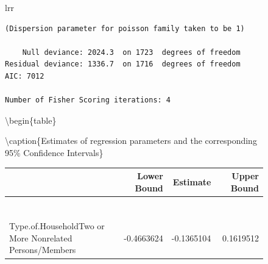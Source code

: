 \documentclass[
]{article}
\begin{document}
\begin{figure}[H]
\begin{table}[H]
\begin{tabular}[t]{lrr}
\begin{verbatim}
(Dispersion parameter for poisson family taken to be 1)

    Null deviance: 2024.3  on 1723  degrees of freedom
Residual deviance: 1336.7  on 1716  degrees of freedom
AIC: 7012

Number of Fisher Scoring iterations: 4
\end{verbatim}

\textbackslash begin\{table\}

\textbackslash caption\{\label{tab:table of estimates and confidence intervals sig}Estimates
of regression parameters and the corresponding 95\% Confidence
Intervals\} \centering

\begin{tabular}[t]{l|r|r|r}
\hline
  & Lower Bound & Estimate & Upper Bound\\
\hline
\cellcolor[HTML]{A1E8F1}{\textcolor{black}{(Intercept)}} & \cellcolor[HTML]{A1E8F1}{\textcolor{black}{1.2992842}} & \cellcolor[HTML]{A1E8F1}{\textcolor{black}{1.4313832}} & \cellcolor[HTML]{A1E8F1}{\textcolor{black}{1.5630233}}\\
\hline
\cellcolor[HTML]{A1E8F1}{\textcolor{black}{Total.Household.Income}} & \cellcolor[HTML]{A1E8F1}{\textcolor{black}{-0.0040352}} & \cellcolor[HTML]{A1E8F1}{\textcolor{black}{-0.0028211}} & \cellcolor[HTML]{A1E8F1}{\textcolor{black}{-0.0016258}}\\
\hline
\cellcolor[HTML]{A1E8F1}{\textcolor{black}{Total.Food.Expenditure}} & \cellcolor[HTML]{A1E8F1}{\textcolor{black}{0.0434480}} & \cellcolor[HTML]{A1E8F1}{\textcolor{black}{0.0503772}} & \cellcolor[HTML]{A1E8F1}{\textcolor{black}{0.0572714}}\\
\hline
\cellcolor[HTML]{A1E8F1}{\textcolor{black}{Household.Head.Age}} & \cellcolor[HTML]{A1E8F1}{\textcolor{black}{-0.0044639}} & \cellcolor[HTML]{A1E8F1}{\textcolor{black}{-0.0027721}} & \cellcolor[HTML]{A1E8F1}{\textcolor{black}{-0.0010820}}\\
\hline
\cellcolor[HTML]{A1E8F1}{\textcolor{black}{House.Age}} & \cellcolor[HTML]{A1E8F1}{\textcolor{black}{-0.0039924}} & \cellcolor[HTML]{A1E8F1}{\textcolor{black}{-0.0024807}} & \cellcolor[HTML]{A1E8F1}{\textcolor{black}{-0.0009811}}\\
\hline
\cellcolor[HTML]{A1E8F1}{\textcolor{black}{Household.Head.SexMale}} & \cellcolor[HTML]{A1E8F1}{\textcolor{black}{0.1626469}} & \cellcolor[HTML]{A1E8F1}{\textcolor{black}{0.2205681}} & \cellcolor[HTML]{A1E8F1}{\textcolor{black}{0.2791383}}\\
\hline
\cellcolor[HTML]{A1E8F1}{\textcolor{black}{Type.of.HouseholdSingle Family}} & \cellcolor[HTML]{A1E8F1}{\textcolor{black}{-0.3969151}} & \cellcolor[HTML]{A1E8F1}{\textcolor{black}{-0.3484617}} & \cellcolor[HTML]{A1E8F1}{\textcolor{black}{-0.2999140}}\\
\hline
Type.of.HouseholdTwo or More Nonrelated Persons/Members & -0.4663624 & -0.1365104 & 0.1619512\\
\hline
\end{tabular}


\end{tabular}
\end{table}
\end{figure}
\end{document}

